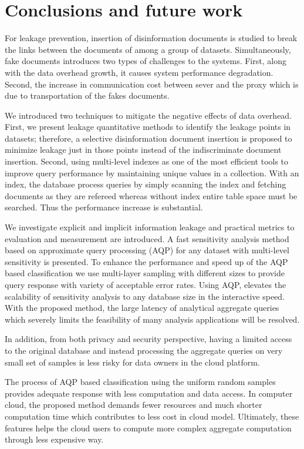 \section{Conclusions and future work}
\label{sec:conclusion}
For leakage prevention, insertion of disinformation documents is studied to break the links between the documents of among a group of datasets. Simultaneously, fake documents introduces two types of challenges to the systems. First, along with the data overhead growth, it causes system performance degradation. Second, the increase in communication cost between sever and the proxy which is due to transportation of the fakes documents.   

We introduced two techniques to mitigate the negative effects of data overhead. First, we present leakage quantitative methods to identify the leakage points in datasets; therefore, a selective disinformation document insertion is proposed to minimize leakage just in those points instead of the indiscriminate document insertion. Second, using multi-level indexes as one of the most efficient tools to improve query performance by maintaining unique values in a collection. With an index, the database process queries by simply scanning the index and fetching documents as they are refereed whereas without index entire table space must be searched. Thus the performance increase is substantial. 

We investigate explicit and implicit information leakage and practical metrics to evaluation and measurement are introduced. A fast sensitivity analysis method based on approximate query processing (AQP) for any dataset with multi-level sensitivity is presented. To enhance the performance and speed up of the AQP based classification we use multi-layer sampling with different sizes to provide query response with variety of acceptable error rates. Using AQP, elevates the scalability of sensitivity analysis to any database size in the interactive speed. With the proposed method, the large latency of analytical aggregate queries which severely limits the feasibility of many analysis applications will be resolved.

In addition, from both privacy and security perspective, having a limited access to the original database and instead processing the aggregate queries on very small set of samples is less risky for data owners in the cloud platform.

The process of AQP based classification using the uniform random samples provides adequate response with less computation and data access. In computer cloud, the proposed method demands fewer resources and much shorter computation time which contributes to less cost in cloud model. Ultimately, these features helps the cloud users to compute more complex aggregate computation through less expensive way.

